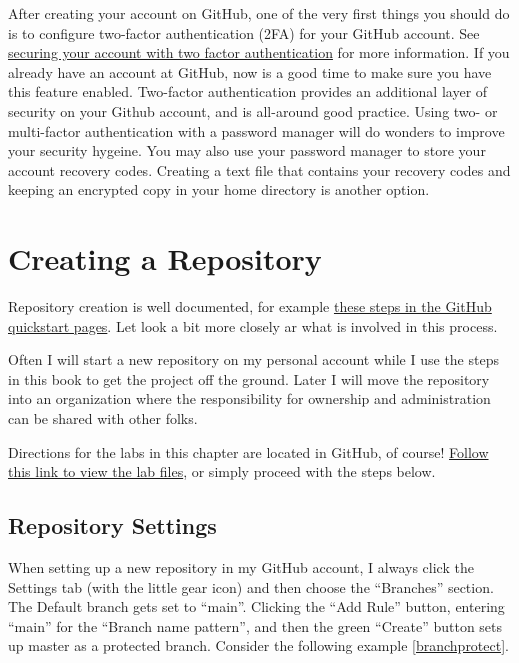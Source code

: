 \justify{}
After creating your account on GitHub, one of the very first things you should do is to configure two-factor authentication (2FA) for your GitHub account.
See \href{https://docs.github.com/en/github/authenticating-to-github/securing-your-account-with-two-factor-authentication-2fa}{securing your account with two factor authentication}
for more information. If you already have an account at GitHub, now is a good time to make sure you have this feature enabled. Two-factor authentication provides
an additional layer of security on your Github account, and is all-around good practice. Using two- or multi-factor authentication with a
password manager will do wonders
to improve your security hygeine. You may also use your password manager to store your account recovery codes. Creating a text file 
that contains your recovery codes and keeping an encrypted copy in your home directory is another option.

\section{Creating a Repository}

Repository creation is well documented, for example
\href{https://docs.github.com/en/get-started/quickstart/create-a-repo}{these steps in the GitHub quickstart pages}. Let look a bit 
more closely ar what is involved in this process.

\justify{}
Often I will start a new repository on my personal account while I use the steps in this book to get the project off the ground.
Later I will move the repository into an organization where the responsibility for ownership and administration can be
shared with other folks.

\justify{}
Directions for the labs in this chapter are located in GitHub, of course! 
\href{https://github.com/devsecfranklin/devsecops-tactical-workbook/tree/main/code/ch5}{Follow this link to view the lab files},
or simply proceed with the steps below.


\subsection{Repository Settings}

\justify{}
When setting up a new repository in my GitHub account, I always click the Settings tab (with the little gear icon) and then choose the
``Branches'' section. The Default branch gets set to ``main''. Clicking the ``Add Rule'' button, entering ``main'' for the ``Branch name pattern'',
and then the green ``Create'' button sets up master as a protected branch. Consider the following example \ref{branchprotect}.

